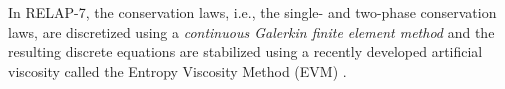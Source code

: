 \documentclass{inputs/mc2015}
\begin{document}
In RELAP-7, the conservation laws, i.e., the single- and two-phase conservation laws, are discretized using a \emph{continuous Galerkin finite element method} and the resulting discrete equations are stabilized using a recently developed artificial viscosity called the Entropy Viscosity Method (EVM) \cite{jlg1, jlg2}.
%
%
\end{document}
